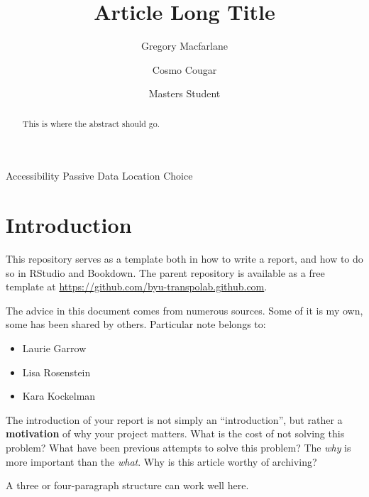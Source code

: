 \documentclass[3p, authoryear]{elsarticle} %
\providecommand{\tightlist}{%
  \setlength{\itemsep}{0pt}\setlength{\parskip}{0pt}}
\begin{document}
\begin{frontmatter}

  \title{Article Long Title}
    \author[Brigham Young University]{Gregory Macfarlane}
    \author[Brigham Young University]{Cosmo Cougar}
    \author[Brigham Young University]{Masters Student}
      \address[Brigham Young University]{Civil and Environmental Engineering Department, 430 Engineering Building, Provo, Utah 84602}
    \address[Another University]{Some Other Place}
  
  \begin{abstract}
  This is where the abstract should go.
  \end{abstract}
   \begin{keyword} Accessibility Passive Data Location Choice\end{keyword}
 \end{frontmatter}

\hypertarget{intro}{%
\section{Introduction}\label{intro}}

This repository serves as a template both in how to write a report, and how
to do so in RStudio and Bookdown. The parent repository is available as a free
template at \url{https://github.com/byu-transpolab.github.com}.

The advice in this document comes from numerous sources. Some of it is my own, some
has been shared by others. Particular note belongs to:

\begin{itemize}
\tightlist
\item
  Laurie Garrow
\item
  Lisa Rosenstein
\item
  Kara Kockelman
\end{itemize}

The introduction of your report is not simply an ``introduction'', but rather a
\textbf{motivation} of why your project matters. What is the cost of not solving
this problem? What have been previous attempts to solve this problem? The \emph{why}
is more important than the \emph{what}. Why is this article worthy of archiving?

A three or four-paragraph structure can work well here.
\end{document}
